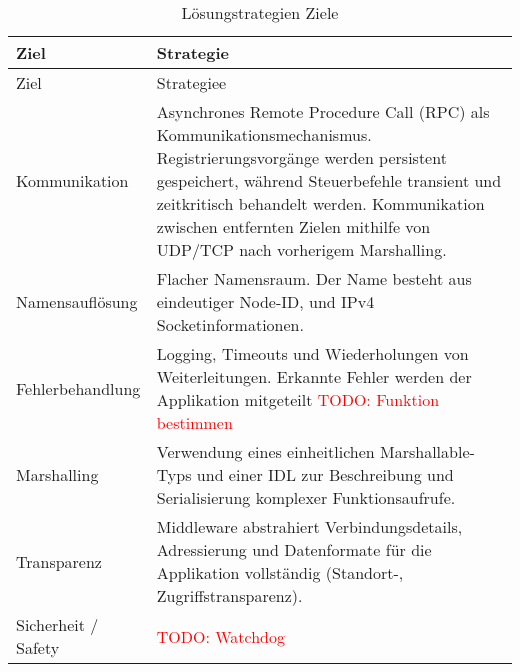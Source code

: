 \begin{longtable}{|>{\raggedright\arraybackslash}p{4cm}|>{\raggedright\arraybackslash}p{10cm}|}
	\caption{Lösungstrategien Ziele} \label{tab:loesungsstrategieZiele} \\
	\hline
	Ziel & Strategie \\
	\hline
	\endfirsthead
	
	\hline
	Ziel & Strategiee\\
	\hline
	\endhead
	
	\hline
	\endfoot
	
	Kommunikation &
	Asynchrones Remote Procedure Call (RPC) als Kommunikationsmechanismus. Registrierungsvorgänge werden persistent gespeichert, während Steuerbefehle transient und zeitkritisch behandelt werden. Kommunikation zwischen entfernten Zielen mithilfe von UDP/TCP nach vorherigem Marshalling.
	\\
	\hline
	Namensauflösung
	& Flacher Namensraum. Der Name besteht aus eindeutiger Node-ID, und IPv4 Socketinformationen. 
	\\
	\hline
	Fehlerbehandlung
	& Logging, Timeouts und Wiederholungen von Weiterleitungen. Erkannte Fehler werden der Applikation mitgeteilt \textcolor{red}{TODO: Funktion bestimmen}
	\\
	\hline
	Marshalling
	& Verwendung eines einheitlichen Marshallable-Typs und einer IDL zur Beschreibung und Serialisierung komplexer Funktionsaufrufe.
	\\
	\hline
	Transparenz
	& Middleware abstrahiert Verbindungsdetails, Adressierung und Datenformate für die Applikation vollständig (Standort-, Zugriffstransparenz).
	\\
	\hline
	Sicherheit / Safety
	& \textcolor{red}{TODO: Watchdog }
	\\
	\hline
	
\end{longtable}


